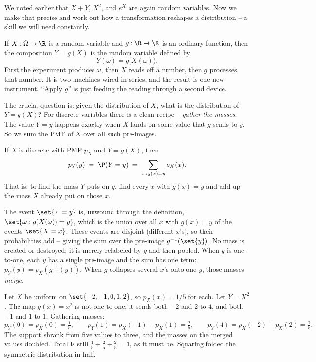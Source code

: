 We noted earlier that $X + Y$, $X^2$, and $e^X$ are again random variables. Now we make
that precise and work out how a transformation reshapes a distribution -- a skill
we will need constantly.

If $X : \Omega \to \R$ is a random variable and $g : \R \to \R$ is an ordinary
function, then the composition $Y = g(X)$ is the random variable defined by
\[
  Y(\omega) = g\big(X(\omega)\big).
\]
First the experiment produces $\omega$, then $X$ reads off a number, then $g$ processes
that number. It is two machines wired in series, and the result is one new instrument.
``Apply $g$'' is just feeding the reading through a second device.

The crucial question is: given the distribution of $X$, what is the distribution of
$Y = g(X)$? For discrete variables there is a clean recipe -- \emph{gather the masses}.
The value $Y = y$ happens exactly when $X$ lands on some value that $g$ sends to $y$.
So we sum the PMF of $X$ over all such pre-images.

\begin{proposition}
\label{ch06:prop-pmf-of-function}
If $X$ is discrete with PMF $p_X$ and $Y = g(X)$, then
\[
  p_Y(y) \;=\; \P(Y = y) \;=\; \sum_{x \,:\, g(x) = y} p_X(x).
\]
That is: to find the mass $Y$ puts on $y$, find every $x$ with $g(x) = y$ and add up
the mass $X$ already put on those $x$.
\end{proposition}

\begin{whybox}
The event $\set{Y = y}$ is, unwound through the definition,
$\set{\omega : g(X(\omega)) = y}$, which is the union over all $x$ with $g(x) = y$ of
the events $\set{X = x}$. These events are disjoint (different $x$'s), so their
probabilities add -- giving the sum over the pre-image $g^{-1}(\set{y})$. No mass is
created or destroyed; it is merely relabeled by $g$ and then pooled. When $g$ is
one-to-one, each $y$ has a single pre-image and the sum has one term:
$p_Y(y) = p_X(g^{-1}(y))$. When $g$ collapses several $x$'s onto one $y$, those masses
\emph{merge}.
\end{whybox}

\begin{example}
\label{ch06:ex-square}
Let $X$ be uniform on $\set{-2,-1,0,1,2}$, so $p_X(x) = 1/5$ for each. Let
$Y = X^2$. The map $g(x) = x^2$ is not one-to-one: it sends both $-2$ and $2$ to $4$,
and both $-1$ and $1$ to $1$. Gathering masses:
\[
  p_Y(0) = p_X(0) = \tfrac{1}{5}, \qquad
  p_Y(1) = p_X(-1) + p_X(1) = \tfrac{2}{5}, \qquad
  p_Y(4) = p_X(-2) + p_X(2) = \tfrac{2}{5}.
\]
The support shrank from five values to three, and the masses on the merged values
doubled. Total is still $\tfrac{1}{5} + \tfrac{2}{5} + \tfrac{2}{5} = 1$, as it must
be. Squaring folded the symmetric distribution in half.
\end{example}

